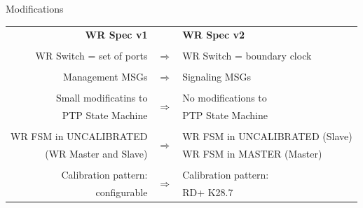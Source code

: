 \documentclass[compress,red]{beamer}
\begin{document}
\subsection{}
\begin{frame}{Modifications}

  \resizebox{11cm}{!} 
  {
    \begin{tabular}{ r c l }
      {\bf WR Spec v1} 		& 		 & {\bf WR Spec v2}  \\
				&     		 &        \\
    WR Switch = set of ports 	& $\Rightarrow$  & WR Switch = boundary clock\\
				&      		 &        \\
    Management MSGs 	 	& $\Rightarrow$  & Signaling MSGs\\
				&      		 &        \\
    Small modificatins to 	& \multirow{2}{*}{$\Rightarrow$}   & No modifications to \\
    PTP State Machine   	&      		 & PTP State Machine       \\
				&      		 &        \\
    WR FSM in UNCALIBRATED 	& \multirow{2}{*}{$\Rightarrow$}   & WR FSM in UNCALIBRATED (Slave) \\
    (WR Master and Slave)  	&   		 & WR FSM in MASTER (Master)\\
				&      		 &        \\
    Calibration pattern:   	& \multirow{2}{*}{$\Rightarrow$}   & Calibration pattern: \\
    configurable		&      		 & RD+ K28.7      \\

    \end{tabular}
	
  }
\end{frame}
\end{document}
